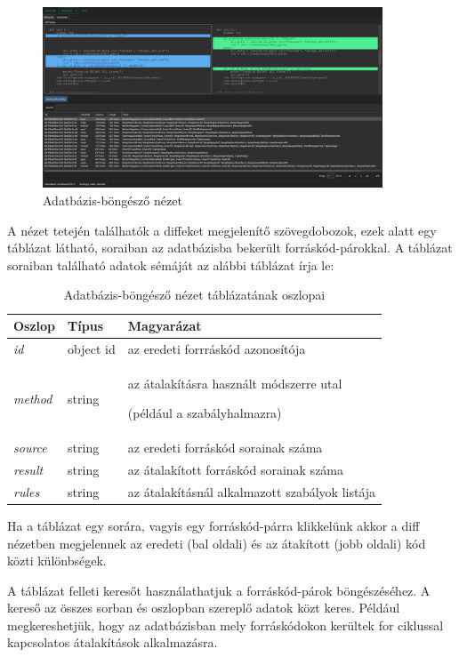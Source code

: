 \begin{figure}[H]
	\centering
	\includegraphics[width=0.9\textwidth]{images/screenshots/database_tab.png}
	\caption{Adatbázis-böngésző nézet}
\end{figure}

A nézet tetején találhatók a diffeket megjelenítő szövegdobozok, ezek alatt
egy táblázat látható, soraiban az adatbázisba bekerült forráskód-párokkal.
A táblázat soraiban található adatok sémáját az alábbi táblázat írja le:

\begin{table}[H]
	\centering
	\begin{tabular}{ | m{} | m{} | m{} | }
		\hline
		\textbf{Oszlop} & \textbf{Típus} & \textbf{Magyarázat} \\
		\hline \hline
		\emph{id} & object id & az eredeti forrráskód azonosítója \\
		\hline
		\emph{method} & string &
		az átalakításra használt módszerre utal 
		
		(például a szabályhalmazra) \\
		\hline
		\emph{source} & string & az eredeti forráskód sorainak száma \\
		\hline
		\emph{result} & string & az átalakított forráskód sorainak száma \\
		\hline
		\emph{rules} & string & az átalakításnál alkalmazott szabályok listája \\
		\hline
	\end{tabular}
	\caption{Adatbázis-böngésző nézet táblázatának oszlopai}
	\label{tab:example-1}
\end{table}

Ha a táblázat egy sorára, vagyis egy forráskód-párra klikkelünk
akkor a diff nézetben megjelennek az eredeti (bal oldali) és az átakított (jobb oldali)
kód közti különbségek.

A táblázat felleti keresőt használathatjuk a forráskód-párok böngészéséhez.
A kereső az összes sorban és oszlopban szereplő adatok közt keres.
Például megkereshetjük, hogy az adatbázisban mely forráskódokon kerültek
for ciklussal kapcsolatos átalakítások alkalmazásra.